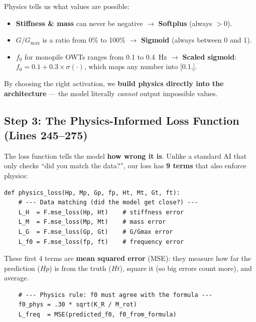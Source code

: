 \documentclass[11pt,a4paper]{article}
\begin{document}
\begin{warnbox}
Physics tells us what values are possible:
\begin{itemize}[nosep]
  \item \textbf{Stiffness \& mass} can never be negative $\to$
        \textbf{Softplus} (always $> 0$).
  \item \textbf{$G/G_{\max}$} is a ratio from 0\% to 100\% $\to$
        \textbf{Sigmoid} (always between 0 and 1).
  \item \textbf{$f_0$} for monopile OWTs ranges from 0.1 to 0.4~Hz $\to$
        \textbf{Scaled sigmoid}: $f_0 = 0.1 + 0.3 \times \sigma(\cdot)$,
        which maps any number into [0.1,].
\end{itemize}
By choosing the right activation, we \textbf{build physics directly
into the architecture} --- the model literally \emph{cannot} output
impossible values.
\end{warnbox}


\subsection{Step 3: The Physics-Informed Loss Function (Lines 245--275)}

The loss function tells the model \textbf{how wrong it is}.
Unlike a standard AI that only checks ``did you match the data?'',
our loss has \textbf{9 terms} that also enforce physics:

\begin{lstlisting}
def physics_loss(Hp, Mp, Gp, fp, Ht, Mt, Gt, ft):
    # --- Data matching (did the model get close?) ---
    L_H  = F.mse_loss(Hp, Ht)    # stiffness error
    L_M  = F.mse_loss(Mp, Mt)    # mass error
    L_G  = F.mse_loss(Gp, Gt)    # G/Gmax error
    L_f0 = F.mse_loss(fp, ft)    # frequency error
\end{lstlisting}

These first 4 terms are \textbf{mean squared error} (MSE): they
measure how far the prediction ($Hp$) is from the truth ($Ht$),
square it (so big errors count more), and average.

\begin{lstlisting}
    # --- Physics rule: f0 must agree with the formula ---
    f0_phys = .30 * sqrt(K_R / M_rot)
    L_freq  = MSE(predicted_f0, f0_from_formula)
\end{lstlisting}
\end{document}
